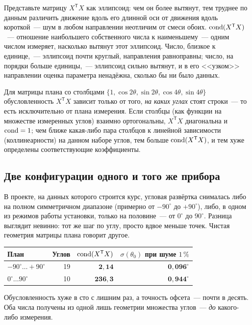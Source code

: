 \begin{intuition}
Представьте матрицу $X^{\mathsf T}X$ как эллипсоид: чем он более вытянут, тем труднее по данным
различить движение вдоль его длинной оси от движения вдоль короткой~--- шум в любом направлении
неотличим от смеси обоих.  $\operatorname{cond}(X^{\mathsf T}X)$~--- отношение
наибольшего собственного числа к наименьшему~--- одним числом измеряет, насколько вытянут этот
эллипсоид. Число, близкое к единице,~--- эллипсоид почти круглый, направления равноправны; число,
на порядки больше единицы,~--- эллипсоид сильно вытянут, и в его <<узком>> направлении оценка
параметра ненадёжна, сколько бы ни было данных.
\end{intuition}

\begin{strict}
Для матрицы плана со столбцами $\{1,\cos2\theta,\sin2\theta,\cos4\theta,\sin4\theta\}$
обусловленность $X^{\mathsf T}X$ зависит только от того, \emph{на каких углах} стоят строки~---
то есть исключительно от плана измерения. Если столбцы (как функции на множестве измеренных
углов) взаимно ортогональны, $X^{\mathsf T}X$ диагональна и $\operatorname{cond}=1$; чем ближе какая-либо пара
столбцов к линейной зависимости (коллинеарности) на данном наборе углов, тем больше
$\operatorname{cond}(X^{\mathsf T}X)$, и тем хуже определены соответствующие коэффициенты.
\end{strict}

\subsection{Две конфигурации одного и того же прибора}
\label{subsec:two-configs}

В проекте, на данных которого строится курс, угловая развёртка снималась либо на полном
симметричном диапазоне (примерно от $-90^\circ$ до $+90^\circ$), либо, в одном из режимов работы
установки, только на половине~--- от $0^\circ$ до $90^\circ$. Разница выглядит невинно: тот же шаг
по углу, просто вдвое меньше точек. Чистая геометрия матрицы плана говорит другое.

\begin{example}
\begin{center}
\footnotesize
\setlength{\tabcolsep}{7pt}
\begin{tabular}{@{}lrrr@{}}
\toprule
\textbf{План} & \textbf{Углов} & $\operatorname{cond}(X^{\mathsf T}X)$ & $\sigma(\theta_0)$ при шуме $1\,\%$\\
\midrule
$-90^\circ\ldots+90^\circ$        & 19 & $\mathbf{2{,}14}$   & $\mathbf{0{,}096^\circ}$ \\
$0^\circ\ldots90^\circ$ & 10 & $\mathbf{236{,}3}$  & $\mathbf{0{,}944^\circ}$ \\
\bottomrule
\end{tabular}
\end{center}
Обусловленность хуже в сто с лишним раз, а точность офсета~--- почти в десять. Оба числа получены
из одной лишь геометрии множества углов~--- \emph{до} какого-либо измерения.
\end{example}

